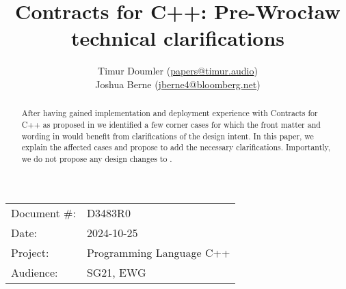 

 \usepackage[bottom]{footmisc} 

 \usepackage{longtable}


\usepackage{tikz,lipsum,lmodern}
\usepackage[most]{tcolorbox}



\usepackage{titlesec}
\usepackage{tocloft}


\newcommand{\changelocaltocdepth}[1]{%
  \addtocontents{toc}{\protect\setcounter{tocdepth}{#1}}%
  \setcounter{tocdepth}{#1}%
}

\setcounter{tocdepth}{3}



\title{Contracts for C++: Pre-Wroc\l aw technical clarifications}
\author{
Timur Doumler \small(\href{mailto:papers@timur.audio}{papers@timur.audio}) \\
Joshua Berne \small(\href{mailto:jberne4@bloomberg.net}{jberne4@bloomberg.net}) \\
}
\date{}
\maketitle

\begin{tabular}{ll}
Document \#: & D3483R0 \\
Date: &2024-10-25 \\
Project: & Programming Language C++ \\
Audience: & SG21, EWG
\end{tabular}

\begin{abstract}
After having gained implementation and deployment experience with Contracts for C++ as proposed in \cite{P2900R10} we identified a few corner cases for which the front matter and wording in \cite{P2900R10} would benefit from clarifications of the design intent. In this paper, we explain the affected cases and propose to add the necessary clarifications. Importantly, we do not propose any design changes to \cite{P2900R10}.
\end{abstract}

